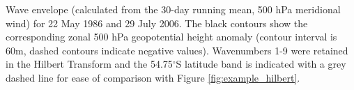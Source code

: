 \label{fig:example_envelope}
Wave envelope (calculated from the 30-day running mean, 500 hPa meridional wind) for 22 May 1986 and 29 July 2006. The black contours show the corresponding zonal 500 hPa geopotential height anomaly (contour interval is 60m, dashed contours indicate negative values). Wavenumbers 1-9 were retained in the Hilbert Transform and the 54.75$^{\circ}$S latitude band is indicated with a grey dashed line for ease of comparison with Figure \ref{fig:example_hilbert}. 